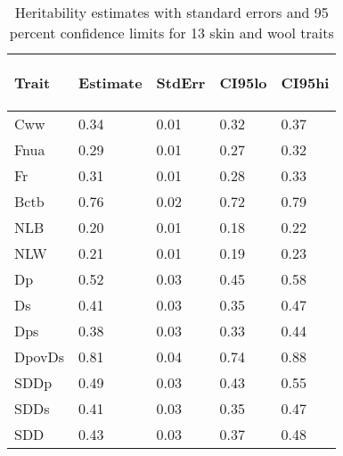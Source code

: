%
\begin{center}
\begin{longtable}{|p{0.9in}|p{0.7in}|p{0.7in}|p{0.7in}|p{0.7in}|}
\caption{Heritability estimates with standard errors and 95 percent confidence limits for 13 skin and wool traits} \\
\hline
\label{tab:herit}

Trait  & Estimate & StdErr & CI95lo & CI95hi \\ 
  \hline
Cww  & 0.34 & 0.01 & 0.32 & 0.37 \\ 
  Fnua  & 0.29 & 0.01 & 0.27 & 0.32 \\ 
  Fr &  0.31 & 0.01 & 0.28 & 0.33 \\ 
  Bctb &  0.76 & 0.02 & 0.72 & 0.79 \\ 
  NLB &  0.20 & 0.01 & 0.18 & 0.22 \\ 
  NLW &  0.21 & 0.01 & 0.19 & 0.23 \\ 
  Dp &  0.52 & 0.03 & 0.45 & 0.58 \\ 
  Ds &  0.41 & 0.03 & 0.35 & 0.47 \\ 
  Dps &  0.38 & 0.03 & 0.33 & 0.44 \\
  DpovDs &  0.81 & 0.04 & 0.74 & 0.88 \\ 
  SDDp &  0.49 & 0.03 & 0.43 & 0.55 \\ 
  SDDs &  0.41 & 0.03 & 0.35 & 0.47 \\ 
  SDD &  0.43 & 0.03 & 0.37 & 0.48 \\ 
   \hline

\end{longtable}
\end{center}
%

